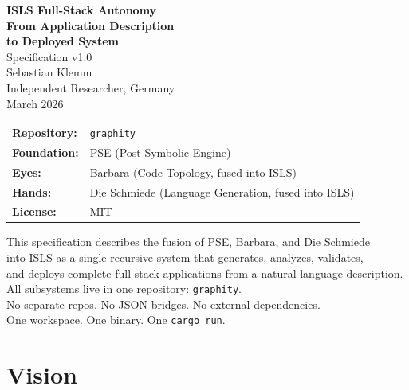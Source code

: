 \documentclass[11pt,a4paper]{article}
\begin{document}
\begin{titlepage}
\begin{center}
\vspace*{2cm}

{\Huge\bfseries ISLS Full-Stack Autonomy}\\[0.8cm]
{\LARGE\bfseries From Application Description\\to Deployed System}\\[1.5cm]
{\Large Specification v1.0}\\[2cm]

{\large Sebastian Klemm}\\[0.3cm]
{\normalsize Independent Researcher, Germany}\\[0.5cm]
{\small March 2026}\\[2cm]

\begin{tabular}{ll}
\textbf{Repository:} & \texttt{graphity} \\
\textbf{Foundation:} & PSE (Post-Symbolic Engine) \\
\textbf{Eyes:} & Barbara (Code Topology, fused into ISLS) \\
\textbf{Hands:} & Die Schmiede (Language Generation, fused into ISLS) \\
\textbf{License:} & MIT \\
\end{tabular}

\vfill

{\small
This specification describes the fusion of PSE, Barbara, and Die Schmiede\\
into ISLS as a single recursive system that generates, analyzes, validates,\\
and deploys complete full-stack applications from a natural language description.\\[0.5cm]
All subsystems live in one repository: \texttt{graphity}.\\
No separate repos. No JSON bridges. No external dependencies.\\
One workspace. One binary. One \texttt{cargo run}.
}

\end{center}
\end{titlepage}

\tableofcontents
\newpage

\section{Vision}
\end{document}
